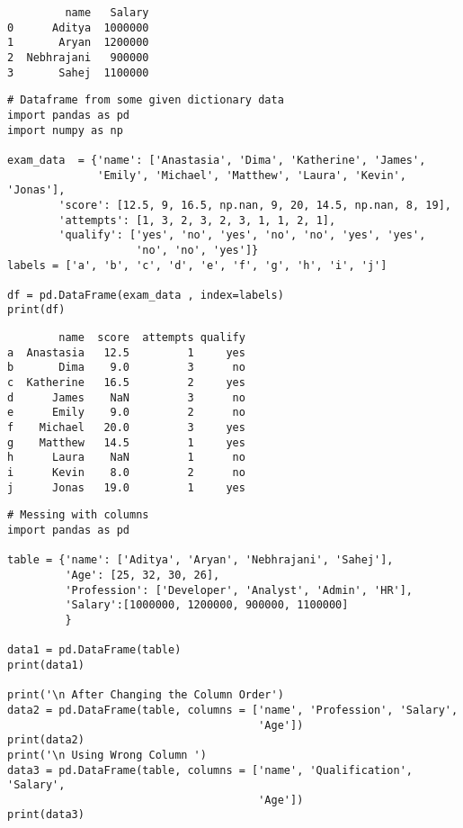 \documentclass[11pt]{article}
\begin{document}
\begin{verbatim}
         name   Salary
0      Aditya  1000000
1       Aryan  1200000
2  Nebhrajani   900000
3       Sahej  1100000
\end{verbatim}


\begin{verbatim}
# Dataframe from some given dictionary data
import pandas as pd
import numpy as np

exam_data  = {'name': ['Anastasia', 'Dima', 'Katherine', 'James',
              'Emily', 'Michael', 'Matthew', 'Laura', 'Kevin', 'Jonas'],
        'score': [12.5, 9, 16.5, np.nan, 9, 20, 14.5, np.nan, 8, 19],
        'attempts': [1, 3, 2, 3, 2, 3, 1, 1, 2, 1],
        'qualify': ['yes', 'no', 'yes', 'no', 'no', 'yes', 'yes',
                    'no', 'no', 'yes']}
labels = ['a', 'b', 'c', 'd', 'e', 'f', 'g', 'h', 'i', 'j']

df = pd.DataFrame(exam_data , index=labels)
print(df)
\end{verbatim}

\begin{verbatim}
        name  score  attempts qualify
a  Anastasia   12.5         1     yes
b       Dima    9.0         3      no
c  Katherine   16.5         2     yes
d      James    NaN         3      no
e      Emily    9.0         2      no
f    Michael   20.0         3     yes
g    Matthew   14.5         1     yes
h      Laura    NaN         1      no
i      Kevin    8.0         2      no
j      Jonas   19.0         1     yes
\end{verbatim}

\begin{verbatim}
# Messing with columns
import pandas as pd

table = {'name': ['Aditya', 'Aryan', 'Nebhrajani', 'Sahej'],
         'Age': [25, 32, 30, 26],
         'Profession': ['Developer', 'Analyst', 'Admin', 'HR'],
         'Salary':[1000000, 1200000, 900000, 1100000]
         }

data1 = pd.DataFrame(table)
print(data1)

print('\n After Changing the Column Order')
data2 = pd.DataFrame(table, columns = ['name', 'Profession', 'Salary',
                                       'Age'])
print(data2)
print('\n Using Wrong Column ')
data3 = pd.DataFrame(table, columns = ['name', 'Qualification', 'Salary',
                                       'Age'])
print(data3)
\end{verbatim}
\end{document}
